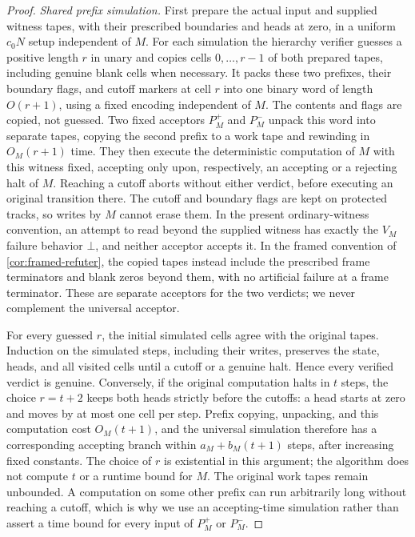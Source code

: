 \documentclass[11pt,letterpaper]{article}
\theoremstyle{definition}
\theoremstyle{remark}
\begin{document}
\begin{proof}
\emph{Shared prefix simulation.} First prepare the actual input and
supplied witness tapes, with their prescribed boundaries and heads at
zero, in a uniform \(c_0N\) setup independent of \(M\). For each
simulation the hierarchy verifier guesses a positive length \(r\) in
unary and copies cells \(0,\ldots,r-1\) of both prepared tapes,
including genuine blank cells when necessary. It packs these two
prefixes, their boundary flags, and cutoff markers at cell \(r\)
into one binary word of length \(O(r+1)\), using a fixed encoding
independent of \(M\). The contents and flags are copied, not guessed.
Two fixed acceptors \(P_M^+\) and \(P_M^-\) unpack this word into
separate tapes, copying the second prefix to a work tape and rewinding
in \(O_M(r+1)\) time. They then execute the deterministic computation
of \(M\) with this witness fixed, accepting only upon, respectively,
an accepting or a rejecting halt of \(M\). Reaching a cutoff aborts
without either verdict, before executing an original transition there.
The cutoff and boundary flags are kept on protected tracks, so writes
by \(M\) cannot erase them. In the present ordinary-witness convention,
an attempt to read beyond the supplied witness has exactly the
\(V_M\) failure behavior \(\bot\), and neither acceptor accepts it.
In the framed convention of \cref{cor:framed-refuter}, the copied
tapes instead include the prescribed frame terminators and blank
zeros beyond them, with no artificial failure at a frame terminator.
These are separate acceptors for the two verdicts; we never complement
the universal acceptor.

For every guessed \(r\), the initial simulated cells agree with the
original tapes. Induction on the simulated steps, including their
writes, preserves the state, heads, and all visited cells until a
cutoff or a genuine halt. Hence every verified verdict is genuine.
Conversely, if the original computation halts in \(t\) steps, the
choice \(r=t+2\) keeps both heads strictly before the cutoffs: a head
starts at zero and moves by at most one cell per step. Prefix copying,
unpacking, and this computation cost \(O_M(t+1)\), and the universal
simulation therefore has a corresponding accepting branch within
\(a_M+b_M(t+1)\) steps, after increasing fixed constants. The choice
of \(r\) is existential in this argument; the algorithm does not
compute \(t\) or a runtime bound for \(M\). The original work tapes
remain unbounded. A computation on some other prefix can run
arbitrarily long without reaching a cutoff, which is why we use an
accepting-time simulation rather than assert a time bound for every
input of \(P_M^+\) or \(P_M^-\).


\end{proof}
\end{document}
